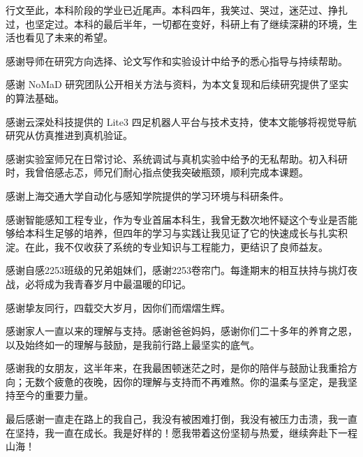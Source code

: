 
\begin{acknowledgements}

  行文至此，本科阶段的学业已近尾声。本科四年，我笑过、哭过，迷茫过、挣扎过，也坚定过。本科的最后半年，一切都在变好，科研上有了继续深耕的环境，生活也看见了未来的希望。
  
  感谢导师在研究方向选择、论文写作和实验设计中给予的悉心指导与持续帮助。

  感谢 NoMaD 研究团队公开相关方法与资料，为本文复现和后续研究提供了坚实的算法基础。

  感谢云深处科技提供的 Lite3 四足机器人平台与技术支持，使本文能够将视觉导航研究从仿真推进到真机验证。

  感谢实验室师兄在日常讨论、系统调试与真机实验中给予的无私帮助。初入科研时，我曾倍感忐忑，师兄们耐心指点使我突破瓶颈，顺利完成本课题。

  感谢上海交通大学自动化与感知学院提供的学习环境与科研条件。

  感谢智能感知工程专业，作为专业首届本科生，我曾无数次地怀疑这个专业是否能够给本科生足够的培养，但四年的学习与实践让我见证了它的快速成长与扎实积淀。在此，我不仅收获了系统的专业知识与工程能力，更结识了良师益友。

  感谢自感2253班级的兄弟姐妹们，感谢2253卷帘门。每逢期末的相互扶持与挑灯夜战，必将成为我青春岁月中最温暖的印记。

  感谢挚友同行，四载交大岁月，因你们而熠熠生辉。
  
  感谢家人一直以来的理解与支持。感谢爸爸妈妈，感谢你们二十多年的养育之恩，以及始终如一的理解与鼓励，是我前行路上最坚实的底气。

  感谢我的女朋友，这半年来，在我最困顿迷茫之时，是你的陪伴与鼓励让我重拾方向；无数个疲惫的夜晚，因你的理解与支持而不再难熬。你的温柔与坚定，是我坚持至今的重要力量。

  最后感谢一直走在路上的我自己，我没有被困难打倒，我没有被压力击溃，我一直在坚持，我一直在成长。我是好样的！愿我带着这份坚韧与热爱，继续奔赴下一程山海！
  
\end{acknowledgements}
